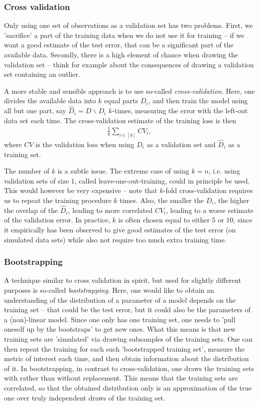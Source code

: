 \documentclass{article}
\begin{document}
\subsubsection{Cross validation} Only using one set of observations as a validation set has two problems. First, we 'sacrifice' a part of the training data when we do not use it for training -- if we want a good estimate of the test error, that can be a significant part of the available data. Secondly, there is a high element of chance when drawing the validation set -- think for example about the consequences of drawing a validation set containing an outlier.

A more stable and sensible approach is to use so-called \emph{cross-validation}. Here, one divides the available data into $k$ equal parts $D_i$, and then train the model using all but one part, say $\hat{D}_{i} = D \backslash D_i$ $k$-times, measuring the error with the left-out data set each time. The cross-validation estimate of the training loss is then
\begin{align*}
    \tfrac{1}{k} \sum_{i\in [k]} CV_i,
\end{align*}
where $CV$ is the validation loss when using $D_i$ as a validation set and $\hat{D}_{i}$ as a training set. 

The number of $k$ is a subtle issue. The extreme case of using $k=n$, i.e. using validation sets of size $1$, called leave-one-out-training, could in principle be used. This would however be very expensive -- note that $k$-fold cross-validation requires us to repeat the training procedure $k$ times. Also, the smaller the $D_i$, the higher the overlap of the $\hat{D}_i$, leading to more correlated $CV_i$, leading to a worse estimate of the validation error. In practice, $k$ is  often chosen equal to either $5$ or $10$, since it empirically has been observed to give good estimates of the test error (on simulated data sets) while also not require too much extra training time.

\subsubsection{Bootstrapping} A technique similar to cross validation in spirit, but used for slightly different purposes is so-called \emph{bootstrapping}. Here, one would like to obtain an understanding of the distribution of a parameter of a model depends on the training set -- that could be the test error, but it could also be the parameters of a (non)-linear model. Since one only has one training set, one needs to 'pull oneself up by the bootstraps' to get new ones. What this means is that new training sets are 'simulated' via drawing subsamples of the training sets. One can then repeat the training for each such 'bootstrapped training set', measure the metric of interest each time, and then obtain information about the distribution of it. In bootstrapping, in contrast to cross-validation, one draws the training sets with rather than without replacement. This means that the training sets are correlated, so that the obtained distribution only is an approximation of the true one over truly independent draws of the training set.
\end{document}
